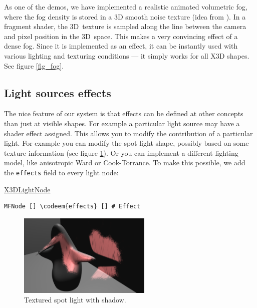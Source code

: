 \documentclass{egpubl}
\newenvironment{mycode}
{\begin{mycodecore}}
{\end{mycodecore}
\vspace{-0.1in}}
\newcommand*{\codeem}[1]{\textbf{#1}}
\begin{document}
As one of the demos, we have implemented a realistic
animated volumetric fog, where the fog density is stored in
a 3D smooth noise texture (idea from \cite{humus:volumetricfog}).
In a fragment shader, the 3D~texture is sampled
along the line between the camera and pixel position in the 3D~space. This makes a very
convincing effect of a dense fog. Since it is implemented as an effect,
it can be instantly used with various lighting and texturing conditions
--- it simply works for all X3D shapes. See figure \ref{fig_fog}.

\subsection{Light sources effects}

The nice feature of our system is that effects can be defined at other
concepts than just at visible shapes. For example a particular light source
may have a shader effect assigned.
This allows you to modify the contribution of a particular light.
For example you can modify the spot light shape, possibly
based on some texture information (see figure \ref{fig_fancy_spot}).
Or you can implement a different lighting model, like anisotropic Ward
or Cook-Torrance.
To make this possible, we add the \texttt{effects} field to every light node:

\begin{mycode}
\underline{X3DLightNode}
\begin{Verbatim}[commandchars=\\\{\},fontsize=\small]
MFNode [] \codeem{effects} [] # Effect
\end{Verbatim}
\end{mycode}

\begin{figure}[H]
  \centering
  \includegraphics[width=2.5in]{fancy_light_spot_shape-cropped}
  \caption{Textured spot light with shadow.}
  \label{fig_fancy_spot}
\end{figure}

\end{document}
